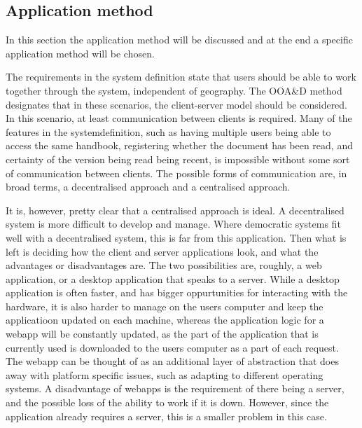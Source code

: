 \subsection{Application method}
In this section the application method will be discussed and at the end a specific application method will be chosen.

The requirements in the system definition state that users should be able to work together through the system, independent of geography.
The OOA\&D method designates that in these scenarios, the client-server model should be considered.
In this scenario, at least communication between clients is required. Many of the features in the systemdefinition, such as having multiple users being able to access the same handbook, registering whether the document has been read, and certainty of the version being read being recent, is impossible without some sort of communication between clients. The possible forms of communication are, in broad terms, a decentralised approach and a centralised approach.

It is, however, pretty clear that a centralised approach is ideal. A decentralised system is more difficult to develop and manage. Where democratic systems fit well with a decentralised system, this is far from this application.
Then what is left is deciding how the client and server applications look, and what the advantages or disadvantages are. The two possibilities are, roughly, a web application, or a desktop application that speaks to a server. While a desktop application is often faster, and has bigger oppurtunities for interacting with the hardware, it is also harder to manage on the users computer and keep the applicatioon updated on each machine, whereas the application logic for a webapp will be constantly updated, as the part of the application that is currently used is downloaded to the users computer as a part of each request. The webapp can be thought of as an additional layer of abstraction that does away with platform specific issues, such as adapting to different operating systems. A disadvantage of webapps is the requirement of there being a server, and the possible loss of the ability to work if it is down. However, since the application already requires a server, this is a smaller problem in this case.


